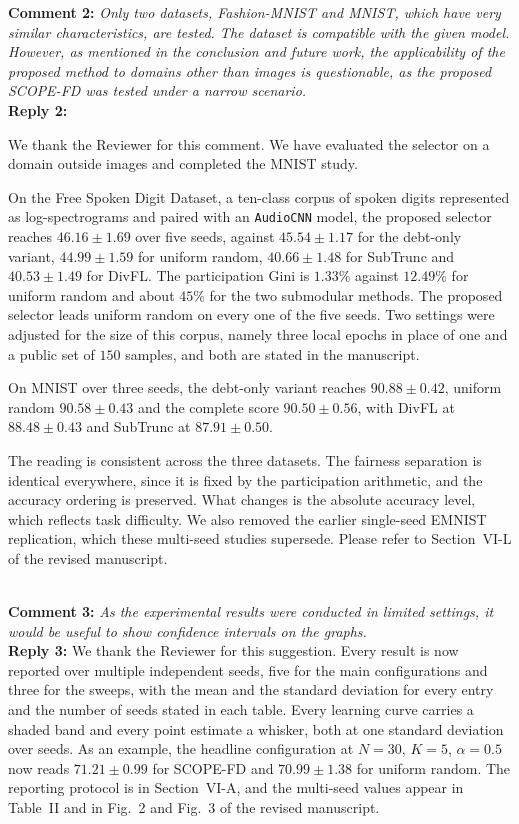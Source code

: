 \documentclass[10pt]{article}
\begin{document}
\noindent
\textbf{Comment 2:} \textit{Only two datasets, Fashion-MNIST and MNIST, which have very similar characteristics, are tested. The dataset is compatible with the given model. However, as mentioned in the conclusion and future work, the applicability of the proposed method to domains other than images is questionable, as the proposed SCOPE-FD was tested under a narrow scenario.} \\
\noindent
\textbf{Reply 2:} {We thank the Reviewer for this comment. We have evaluated the selector on a domain outside images and completed the MNIST study.

On the Free Spoken Digit Dataset, a ten-class corpus of spoken digits represented as log-spectrograms and paired with an \texttt{AudioCNN} model, the proposed selector reaches $46.16 \pm 1.69$ over five seeds, against $45.54 \pm 1.17$ for the debt-only variant, $44.99 \pm 1.59$ for uniform random, $40.66 \pm 1.48$ for SubTrunc and $40.53 \pm 1.49$ for DivFL. The participation Gini is $1.33\%$ against $12.49\%$ for uniform random and about $45\%$ for the two submodular methods. The proposed selector leads uniform random on every one of the five seeds. Two settings were adjusted for the size of this corpus, namely three local epochs in place of one and a public set of $150$ samples, and both are stated in the manuscript.

On MNIST over three seeds, the debt-only variant reaches $90.88 \pm 0.42$, uniform random $90.58 \pm 0.43$ and the complete score $90.50 \pm 0.56$, with DivFL at $88.48 \pm 0.43$ and SubTrunc at $87.91 \pm 0.50$.

The reading is consistent across the three datasets. The fairness separation is identical everywhere, since it is fixed by the participation arithmetic, and the accuracy ordering is preserved. What changes is the absolute accuracy level, which reflects task difficulty. We also removed the earlier single-seed EMNIST replication, which these multi-seed studies supersede. Please refer to Section~VI-L of the revised manuscript.}\\

\noindent
\textbf{Comment 3:} \textit{As the experimental results were conducted in limited settings, it would be useful to show confidence intervals on the graphs.} \\
\noindent
\textbf{Reply 3:} {We thank the Reviewer for this suggestion. Every result is now reported over multiple independent seeds, five for the main configurations and three for the sweeps, with the mean and the standard deviation for every entry and the number of seeds stated in each table. Every learning curve carries a shaded band and every point estimate a whisker, both at one standard deviation over seeds. As an example, the headline configuration at $N=30$, $K=5$, $\alpha=0.5$ now reads $71.21 \pm 0.99$ for SCOPE-FD and $70.99 \pm 1.38$ for uniform random. The reporting protocol is in Section~VI-A, and the multi-seed values appear in Table~II and in Fig.~2 and Fig.~3 of the revised manuscript.}\\
\end{document}
